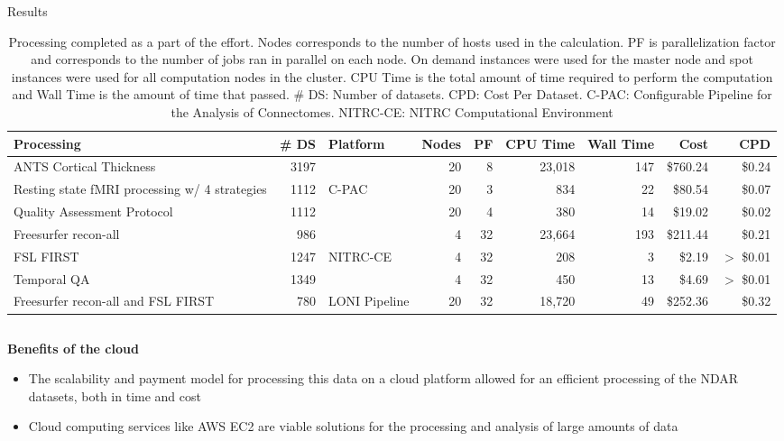\documentclass[final,hyperref={pdfpagelabels=false}]{beamer}
\begin{document}
\begin{frame}
\begin{columns}
\begin{column}{.5\textwidth}
{\begin{block}{Results}
\begin{center}
			\begin{table}
			  \caption{Processing completed as a part of the effort. Nodes corresponds to the number of hosts used in the calculation. PF is parallelization factor and corresponds to the number of jobs ran in parallel on each node. On demand instances were used for the master node and spot instances were used for all computation nodes in the cluster. CPU Time is the total amount of time required to perform the computation and Wall Time is the amount of time that passed. \# DS: Number of datasets. CPD: Cost Per Dataset. C-PAC: Configurable Pipeline for the Analysis of Connectomes. NITRC-CE: NITRC Computational Environment}
			  \begin{tabular}{lrl*{6}{r}}
				  {\bf Processing} & {\bf \# DS} & {\bf Platform} & {\bf Nodes} & {\bf PF} & {\bf CPU Time} & {\bf Wall Time} & {\bf Cost} & {\bf CPD}\\
			      \hline
				  ANTS Cortical Thickness & 3197 &  & 20 & 8 & 23,018 & 147 & \$760.24 & \$0.24\\
			 	  Resting state fMRI processing w/ 4 strategies & 1112 & C-PAC  & 20 & 3 & 834 & 22 & \$80.54 & \$0.07 \\
				  Quality Assessment Protocol & 1112 & & 20 & 4 & 380 & 14 & \$19.02 & \$0.02 \\
				  \hline
				  Freesurfer recon-all & 986 &  & 4 & 32 & 23,664 & 193 & \$211.44 & \$0.21 \\
				  FSL FIRST & 1247 & NITRC-CE & 4 & 32 & 208 & 3 & \$2.19 & $>$ \$0.01 \\
				  Temporal QA & 1349 &  & 4 & 32 & 450 & 13 & \$4.69 & $>$ \$0.01 \\
				  \hline
				  Freesurfer recon-all and FSL FIRST & 780 & LONI Pipeline & 20 & 32 & 18,720 & 49 & \$252.36 & \$0.32 \\
			 \end{tabular}
			\end{table}
			 \end{center}
              \begin{column}{.47\textwidth}
                  {\bf Benefits of the cloud}
                  \begin{itemize}
                      \item The scalability and payment model for processing this data on a cloud platform allowed for an efficient processing of the NDAR datasets, both in time and cost
                      \item Cloud computing services like AWS EC2 are viable solutions for the processing and analysis of large amounts of data

\end{itemize}
\end{column}
\end{block}}
\end{column}
\end{columns}
\end{frame}
\end{document}
